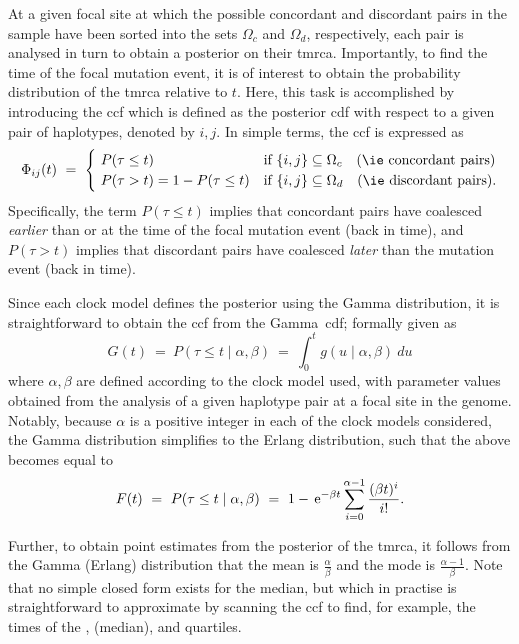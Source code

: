 At a given focal site at which the possible concordant and discordant pairs in the sample have been sorted into the sets $\Omega_c$ and $\Omega_d$, respectively, each pair is analysed in turn to obtain a posterior on their \gls{tmrca}.
Importantly, to find the time of the focal mutation event, it is of interest to obtain the probability distribution of the \gls{tmrca} relative to $t$.
Here, this task is accomplished by introducing the \gls{ccf} which is defined as the posterior \gls{cdf} with respect to a given pair of haplotypes, denoted by ${i,j}$.
In simple terms, the \gls{ccf} is expressed as
\begin{equation}\label{eq:cumcoalfunc}
	\Phi_{ij}(t)~=~
	\begin{cases}
    ~ P(\tau \leq t)                  & \text{if}~{\{i,j\} \subseteq \Omega_c}\quad\text{(\ie concordant pairs)} \\
    ~ P(\tau >    t)=1-P(\tau \leq t) & \text{if}~{\{i,j\} \subseteq \Omega_d}\quad\text{(\ie discordant pairs)}\text{.}
  \end{cases}
\end{equation}
Specifically, the term ${P(\tau \leq t)}$ implies that concordant pairs have coalesced \emph{earlier} than or at the time of the focal mutation event (back in time), and ${P(\tau >t)}$ implies that discordant pairs have coalesced \emph{later} than the mutation event (back in time).

Since each clock model defines the posterior using the Gamma distribution, it is straightforward to obtain the \gls{ccf} from the Gamma~\gls{cdf}; formally given as
\begin{equation}
	G(t)~=~P(\tau \leq t \mid\alpha,\beta)~=~\int_{0}^{t}g(u\mid\alpha,\beta)~du
\end{equation}
where $\alpha,\beta$ are defined according to the clock model used, with parameter values obtained from the analysis of a given haplotype pair at a focal site in the genome.
Notably, because $\alpha$ is a positive integer in each of the clock models considered, the Gamma distribution simplifies to the Erlang distribution, such that the above becomes equal to \citep{papoulis2002probability}
\begin{equation}
	F(t)~=~P(\tau \leq t \mid\alpha,\beta)~=~1-\,\mathrm{e}^{-\beta t}\sum_{i=0}^{\alpha-1}\frac{(\beta t)^i}{i!}\text{.}
\end{equation}

Further, to obtain point estimates from the posterior of the \gls{tmrca},
it follows from the Gamma (Erlang) distribution that the mean is $\frac{\alpha}{\beta}$ and the mode is $\frac{\alpha-1}{\beta}$.
Note that no simple closed form exists for the median, but which in practise is straightforward to approximate by scanning the \gls{ccf} to find, for example, the times of the ,  (\ie median), and  quartiles.



